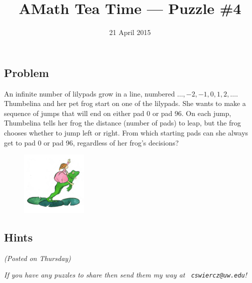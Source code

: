 \documentclass[12pt]{article}
\title{AMath Tea Time --- Puzzle \#4}
\author{}
\date{\vspace{-1cm}21 April 2015}
\begin{document}
\maketitle
{}

\subsection*{Problem}

An infinite number of lilypads grow in a line, numbered $\ldots, -2, -1, 0, 1,
2, \ldots$. Thumbelina and her pet frog start on one of the lilypads. She wants
to make a sequence of jumps that will end on either pad 0 or pad 96. On each
jump, Thumbelina tells her frog the distance (number of pads) to leap, but the
frog chooses whether to jump left or right. From which starting pads can she
always get to pad 0 or pad 96, regardless of her frog's decisions?

\begin{figure}[hb]
  \centering
  \includegraphics[width=120px]{thumb.png}
\end{figure}

\subsection*{Hints}

{\it (Posted on Thursday)}


{
\par\vspace*{\fill}
\noindent \small \it
If you have any puzzles to share then send them my way at {\tt
  cswiercz@uw.edu}!
}
\end{document}
